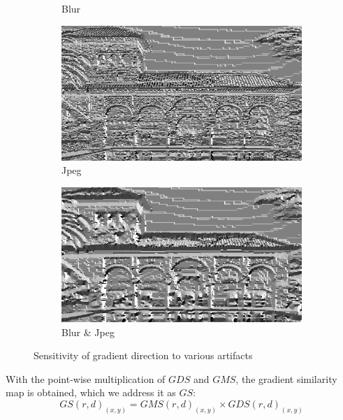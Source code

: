 \begin{figure}
\begin{subfigure}[b]{0.24\textwidth}
         \caption{Blur}
     \end{subfigure}
     \hfill
     \begin{subfigure}[b]{0.24\textwidth}
         \centering
         \includegraphics[width= \textwidth]{./figs/dir_jpeg3}
         \caption{Jpeg}
     \end{subfigure}
     \hfill
     \begin{subfigure}[b]{0.24\textwidth}
         \centering
         \includegraphics[width= \textwidth]{./figs/dir_blur3_jpeg_3}
         \caption{Blur \& Jpeg}
     \end{subfigure}
     \caption{Sensitivity of gradient direction to various artifacts}
        \label{fig:dir_dsts}
\end{figure}
With the point-wise multiplication of $GDS$ and $GMS$, the gradient similarity map is obtained, which we address it as $GS$:
\begin{equation}
    GS(r, d)_{(x, y)} = GMS(r, d)_{(x, y)}\times GDS(r, d)_{(x, y)}
    \label{eq:gradien t_similarity}
\end{equation}
